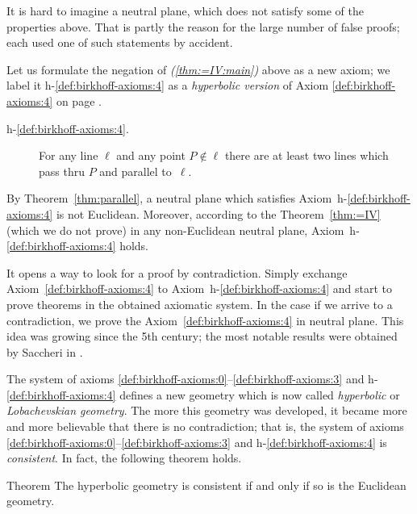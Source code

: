 It is hard to imagine a neutral plane, which does not satisfy some of the properties above.
That is partly the reason for the large number of false proofs;
each used one of such statements by accident.

Let us formulate the negation of \textit{(\ref{thm:=IV:main})} above as a new axiom;
we label it h-$\!$\ref{def:birkhoff-axioms:4} as a {}\emph{hyperbolic version} of Axiom \ref{def:birkhoff-axioms:4} on page \pageref{def:birkhoff-axioms:4}.


\begin{framed}
\begin{description}
\item[{\rm h-$\!$\ref{def:birkhoff-axioms:4}.}]\label{def:hyperbolic-4a}  
For any line $\ell$ and any point $P\notin\ell$ 
there are at least two lines which pass thru $P$ 
and parallel to~$\ell$.
\end{description}
\end{framed}

By Theorem~\ref{thm:parallel}, a neutral plane which satisfies Axiom~h-$\!$\ref{def:birkhoff-axioms:4} is not Euclidean. 
Moreover, according to the Theorem~\ref{thm:=IV} (which we do not prove) 
in any non-Euclidean neutral plane, Axiom~h-$\!$\ref{def:birkhoff-axioms:4} holds.

It opens a way to look for a proof by contradiction.
Simply exchange  Axiom~\ref{def:birkhoff-axioms:4} to Axiom~h-$\!$\ref{def:birkhoff-axioms:4}
 and start to prove theorems in the obtained axiomatic system.
In the case if we arrive to a contradiction, 
we prove the Axiom~\ref{def:birkhoff-axioms:4} in neutral plane.
This idea was growing since the 5th century;
the most notable results were obtained by Saccheri in \cite{saccheri}.

The system of axioms \ref{def:birkhoff-axioms:0}--\ref{def:birkhoff-axioms:3} and h-$\!$\ref{def:birkhoff-axioms:4} defines a new geometry which is now called \emph{hyperbolic} or  \emph{Lobachevskian geometry}.
The more this geometry was developed,
it became more and more believable that there is no contradiction;
that is, the system of axioms \ref{def:birkhoff-axioms:0}--\ref{def:birkhoff-axioms:3} and h-$\!$\ref{def:birkhoff-axioms:4} is \emph{consistent}.
In fact, the following theorem holds.


\begin{thm}{Theorem}\label{thm:consistent}
The hyperbolic geometry is consistent if and only if so is the Euclidean geometry.
\end{thm}

